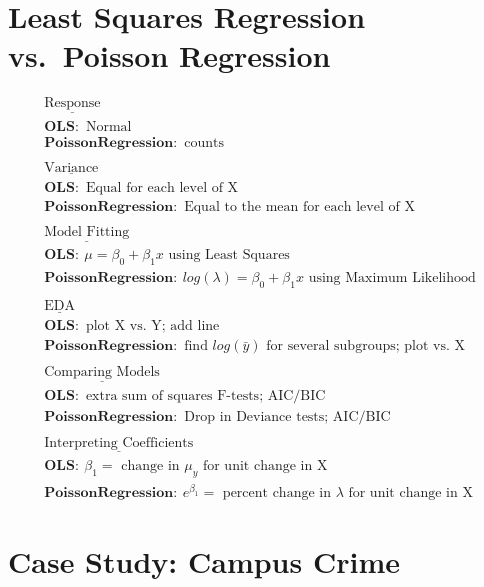 \documentclass[
]{krantz}
\begin{document}
\hypertarget{least-squares-regression-vs.-poisson-regression}{%
\section{Least Squares Regression vs.~Poisson Regression}\label{least-squares-regression-vs.-poisson-regression}}

\begin{gather*}
\underline{\textrm{Response}} \\
\mathbf{OLS:}\textrm{ Normal} \\
\mathbf{Poisson Regression:}\textrm{ counts} \\
\textrm{ } \\
\underline{\textrm{Variance}} \\
\mathbf{OLS:}\textrm{ Equal for each level of X} \\
\mathbf{Poisson Regression:}\textrm{ Equal to the mean for each level of X} \\
\textrm{ } \\
\underline{\textrm{Model Fitting}} \\
\mathbf{OLS:}\ \mu=\beta_0+\beta_1x \textrm{ using Least Squares}\\
\mathbf{Poisson Regression:}\ log(\lambda)=\beta_0+\beta_1x \textrm{ using Maximum Likelihood}\\
\textrm{ } \\
\underline{\textrm{EDA}} \\
\mathbf{OLS:}\textrm{ plot X vs. Y; add line} \\
\mathbf{Poisson Regression:}\textrm{ find }log(\bar{y})\textrm{ for several subgroups; plot vs. X} \\
\textrm{ } \\
\underline{\textrm{Comparing Models}} \\
\mathbf{OLS:}\textrm{ extra sum of squares F-tests; AIC/BIC} \\
\mathbf{Poisson Regression:}\textrm{ Drop in Deviance tests; AIC/BIC} \\
\textrm{ } \\
\underline{\textrm{Interpreting Coefficients}} \\
\mathbf{OLS:}\ \beta_1=\textrm{ change in }\mu_y\textrm{ for unit change in X} \\
\mathbf{Poisson Regression:}\ e^{\beta_1}=\textrm{ percent change in }\lambda\textrm{ for unit change in X} 
\end{gather*}

\hypertarget{case-study-campus-crime}{%
\section{Case Study: Campus Crime}\label{case-study-campus-crime}}
\end{document}
